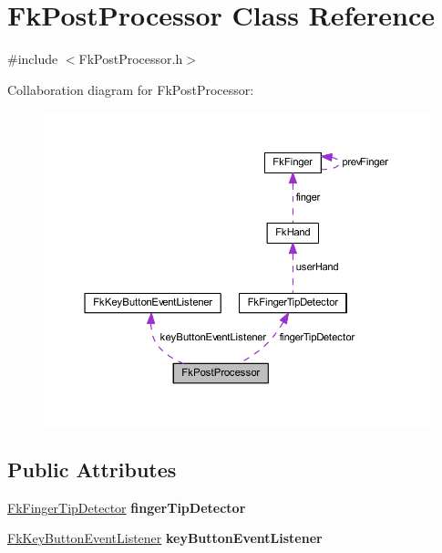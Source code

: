 \hypertarget{class_fk_post_processor}{}\section{Fk\+Post\+Processor Class Reference}
\label{class_fk_post_processor}


{\ttfamily \#include $<$Fk\+Post\+Processor.\+h$>$}



Collaboration diagram for Fk\+Post\+Processor\+:
\nopagebreak
\begin{figure}[H]
\begin{center}
\leavevmode
\includegraphics[width=350pt]{class_fk_post_processor__coll__graph}
\end{center}
\end{figure}
\subsection*{Public Attributes}
\begin{DoxyCompactItemize}
\item 
\hypertarget{class_fk_post_processor_a9fc004c9ccfd2ff8d40685d493484f88}{}\hyperlink{class_fk_finger_tip_detector}{Fk\+Finger\+Tip\+Detector} {\bfseries finger\+Tip\+Detector}\label{class_fk_post_processor_a9fc004c9ccfd2ff8d40685d493484f88}

\item 
\hypertarget{class_fk_post_processor_a7478ef484646566ade5509af57e1ca16}{}\hyperlink{class_fk_key_button_event_listener}{Fk\+Key\+Button\+Event\+Listener} {\bfseries key\+Button\+Event\+Listener}\label{class_fk_post_processor_a7478ef484646566ade5509af57e1ca16}

\end{DoxyCompactItemize}


